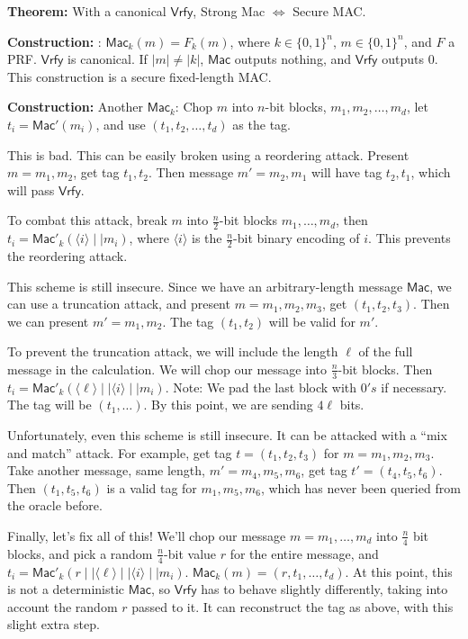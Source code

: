\documentclass[10pt]{article}
\newcommand{\thm}[1]{{\bf Theorem:} \underline{#1}}
\newcommand{\con}[1]{{\bf Construction:} \underline{#1}}
\newcommand{\Mac}{\mathsf{Mac}}
\newcommand{\Vrfy}{\mathsf{Vrfy}}
\newcommand{\ang}[1]{\langle#1\rangle}
\begin{document}
\begin{multicols}{3}
\thm{} With a canonical $\Vrfy$, Strong Mac $\Leftrightarrow$ Secure MAC.

\con{}: $\Mac_k(m)=F_k(m)$, where $k\in\{0,1\}^n$, $m\in\{0,1\}^n$, and $F$ a PRF. $\Vrfy$ is canonical. If $|m|\neq|k|$, $\Mac$ outputs nothing, and $\Vrfy$ outputs $0$. This construction is a secure fixed-length MAC.

\con{} Another $\Mac_k$: Chop $m$ into $n$-bit blocks, $m_1,m_2,\dots,m_d$, let $t_i=\Mac'(m_i)$, and use $(t_1,t_2,\dots,t_d)$ as the tag.

This is bad. This can be easily broken using a reordering attack. Present $m=m_1,m_2$, get tag $t_1,t_2$. Then message $m'=m_2,m_1$ will have tag $t_2,t_1$, which will pass $\Vrfy$.

To combat this attack, break $m$ into $\frac{n}{2}$-bit blocks $m_1,\dots,m_d$, then $t_i=\Mac'_k(\ang{i}\mid\mid m_i)$, where $\ang{i}$ is the $\frac{n}{2}$-bit binary encoding of $i$. This prevents the reordering attack.

This scheme is still insecure. Since we have an arbitrary-length message $\Mac$, we can use a truncation attack, and present $m=m_1,m_2,m_3$, get $(t_1,t_2,t_3)$. Then we can present $m'=m_1,m_2$. The tag $(t_1,t_2)$ will be valid for $m'$.

To prevent the truncation attack, we will include the length $\ell$ of the full message in the calculation. We will chop our message into $\frac{n}{3}$-bit blocks. Then $t_i=\Mac'_k(\ang{\ell}\mid\mid\ang{i}\mid\mid m_i)$. Note: We pad the last block with $0's$ if necessary. The tag will be $(t_1,\dots)$. By this point, we are sending $4\ell$ bits.

Unfortunately, even this scheme is still insecure. It can be attacked with a ``mix and match'' attack. For example, get tag $t=(t_1,t_2,t_3)$ for $m=m_1,m_2,m_3$. Take another message, same length, $m'=m_4,m_5,m_6$, get tag $t'=(t_4,t_5,t_6)$. Then $(t_1,t_5,t_6)$ is a valid tag for $m_1,m_5,m_6$, which has never been queried from the oracle before.

Finally, let's fix all of this! We'll chop our message $m=m_1,\dots,m_d$ into $\frac{n}{4}$ bit blocks, and pick a random $\frac{n}{4}$-bit value $r$ for the entire message, and $t_i=\Mac'_k(r\mid\mid\ang{\ell}\mid\mid\ang{i}\mid\mid m_i)$. $\Mac_k(m)=(r,t_1,\dots,t_d)$. At this point, this is not a deterministic $\Mac$, so $\Vrfy$ has to behave slightly differently, taking into account the random $r$ passed to it. It can reconstruct the tag as above, with this slight extra step.


\end{multicols}
\end{document}
